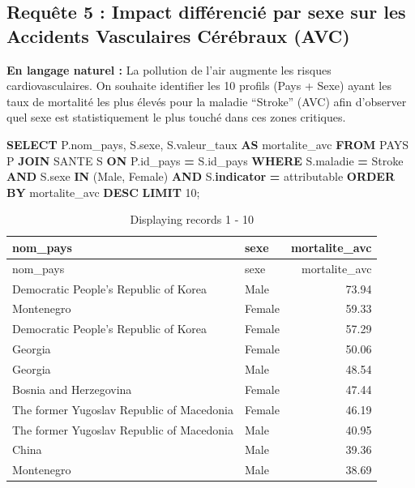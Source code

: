 \documentclass[mstat,12pt]{unswthesis}
\newenvironment{Shaded}{\begin{snugshade}}{\end{snugshade}}
\newcommand{\DecValTok}[1]{\textcolor[rgb]{0.00,0.00,0.81}{#1}}
\newcommand{\KeywordTok}[1]{\textcolor[rgb]{0.13,0.29,0.53}{\textbf{#1}}}
\newcommand{\NormalTok}[1]{#1}
\newcommand{\OperatorTok}[1]{\textcolor[rgb]{0.81,0.36,0.00}{\textbf{#1}}}
\newcommand{\StringTok}[1]{\textcolor[rgb]{0.31,0.60,0.02}{#1}}
\begin{document}
\medskip

\subsection{Requête 5 : Impact différencié par sexe sur les Accidents
Vasculaires Cérébraux
(AVC)}\label{requuxeate-5-impact-diffuxe9renciuxe9-par-sexe-sur-les-accidents-vasculaires-cuxe9ruxe9braux-avc}

\textbf{En langage naturel :} La pollution de l'air augmente les risques
cardiovasculaires. On souhaite identifier les 10 profils (Pays + Sexe)
ayant les taux de mortalité les plus élevés pour la maladie ``Stroke''
(AVC) afin d'observer quel sexe est statistiquement le plus touché dans
ces zones critiques.

\begin{Shaded}
\begin{Highlighting}[]
\KeywordTok{SELECT}\NormalTok{ P.nom\_pays, }
\NormalTok{       S.sexe, }
\NormalTok{       S.valeur\_taux }\KeywordTok{AS}\NormalTok{ mortalite\_avc }
\KeywordTok{FROM}\NormalTok{ PAYS P }
\KeywordTok{JOIN}\NormalTok{ SANTE S }\KeywordTok{ON}\NormalTok{ P.id\_pays }\OperatorTok{=}\NormalTok{ S.id\_pays }
\KeywordTok{WHERE}\NormalTok{ S.maladie }\OperatorTok{=} \StringTok{\textquotesingle{}Stroke\textquotesingle{}} 
  \KeywordTok{AND}\NormalTok{ S.sexe }\KeywordTok{IN}\NormalTok{ (}\StringTok{\textquotesingle{}Male\textquotesingle{}}\NormalTok{, }\StringTok{\textquotesingle{}Female\textquotesingle{}}\NormalTok{)}
  \KeywordTok{AND}\NormalTok{ S.}\KeywordTok{indicator} \OperatorTok{=} \StringTok{\textquotesingle{}attributable\textquotesingle{}}
\KeywordTok{ORDER} \KeywordTok{BY}\NormalTok{ mortalite\_avc }\KeywordTok{DESC}
\KeywordTok{LIMIT} \DecValTok{10}\NormalTok{;}
\end{Highlighting}
\end{Shaded}

\begin{longtable}[]{@{}llr@{}}
\caption{Displaying records 1 - 10}\tabularnewline
\toprule\noalign{}
nom\_pays & sexe & mortalite\_avc \\
\midrule\noalign{}
\endfirsthead
\toprule\noalign{}
nom\_pays & sexe & mortalite\_avc \\
\midrule\noalign{}
\endhead
\bottomrule\noalign{}
\endlastfoot
Democratic People's Republic of Korea & Male & 73.94 \\
Montenegro & Female & 59.33 \\
Democratic People's Republic of Korea & Female & 57.29 \\
Georgia & Female & 50.06 \\
Georgia & Male & 48.54 \\
Bosnia and Herzegovina & Female & 47.44 \\
The former Yugoslav Republic of Macedonia & Female & 46.19 \\
The former Yugoslav Republic of Macedonia & Male & 40.95 \\
China & Male & 39.36 \\
Montenegro & Male & 38.69 \\
\end{longtable}
\end{document}
